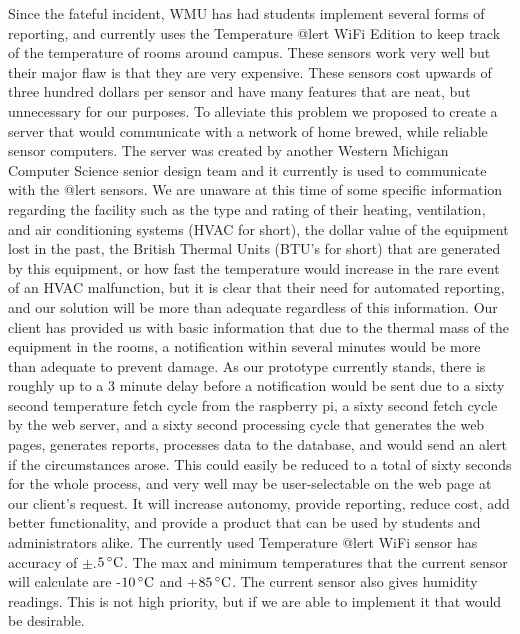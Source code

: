 \documentclass{report}
\begin{document}
Since the fateful incident, WMU has had students implement several forms of reporting, and currently uses the Temperature @lert WiFi Edition to keep track of the temperature of rooms around campus. 
These sensors work very well but their major flaw is that they are very expensive. These sensors cost upwards of three hundred dollars per sensor and have many features that are neat, but unnecessary for our purposes. 
To alleviate this problem we proposed to create a server that would communicate with a network of home brewed, while reliable sensor computers. 
The server was created by another Western Michigan Computer Science senior design team and it currently is used to communicate with the @lert sensors.
\newline
\indent  
We are unaware at this time of some specific information regarding the facility such as the type and rating of their heating, ventilation, and air conditioning systems (HVAC for short), the dollar value of the equipment lost in the past, the British Thermal Units (BTU’s for short) that are generated by this equipment, or how fast the temperature would increase in the rare event of an HVAC malfunction, but it is clear that their need for automated reporting, and our solution will be more than adequate regardless of this information. Our client has provided us with basic information that due to the thermal mass of the equipment in the rooms, a notification within several minutes would be more than adequate to prevent damage. As our prototype currently stands, there is roughly up to a 3 minute delay before a notification would be sent due to a sixty second temperature fetch cycle from the raspberry pi, a sixty second fetch cycle by the web server, and a sixty second processing cycle that generates the web pages, generates reports, processes data to the database, and would send an alert if the circumstances arose. This could easily be reduced to a total of sixty seconds for the whole process, and very well may be user-selectable on the web page at our client's request. 
It will increase autonomy, provide reporting, reduce cost, add better functionality, 
and provide a product that can be used by students and administrators alike.
\newline
\indent
	The currently used Temperature @lert WiFi sensor has accuracy of $\pm$.$5\,^{\circ}{\rm C}$. The max and minimum temperatures that the current sensor will calculate are -$10\,^{\circ}{\rm C}$ and +$85\,^{\circ}{\rm C}$. 
The current sensor also gives humidity readings. 
This is not high priority, but if we are able to implement it that would be desirable.
\end{document}
